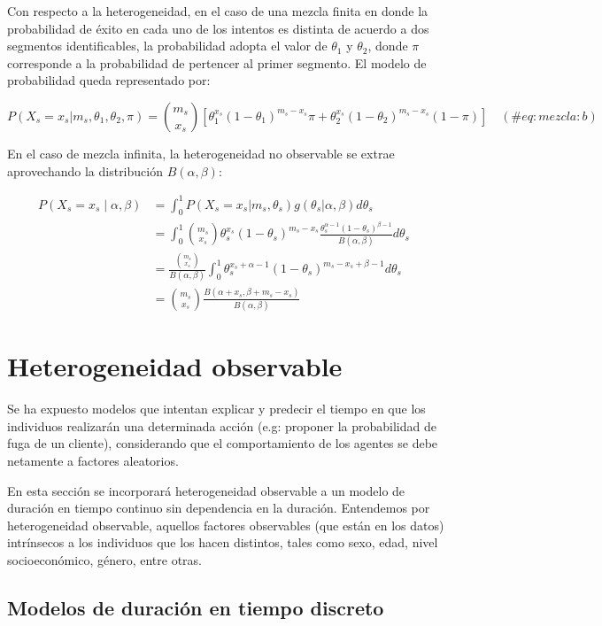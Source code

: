 \documentclass[
]{book}
\begin{document}
Con respecto a la heterogeneidad, en el caso de una mezcla finita en
donde la probabilidad de éxito en cada uno de los intentos es distinta
de acuerdo a dos segmentos identificables, la probabilidad adopta el
valor de \(\theta_1\) y \(\theta_2\), donde \(\pi\) corresponde a la
probabilidad de pertencer al primer segmento. El modelo de probabilidad
queda representado por:

\[P(X_s = x_s | m_s, \theta_1, \theta_2, \pi) = \binom{m_s}{x_s} \left[ \theta_1^{x_s}(1-\theta_1)^{m_s-x_s}\pi + \theta_2^{x_s}(1-\theta_2)^{m_s-x_s}(1-\pi) \right] \quad (\#eq:mezcla:b)\]

En el caso de mezcla infinita, la heterogeneidad no observable se extrae
aprovechando la distribución \(B(\alpha,\beta)\):

\[
\begin{aligned}
P(X_s = x_s \mid \alpha, \beta) &= \int_{0}^{1} P(X_s = x_s|m_s,\theta_s) g(\theta_s|\alpha,\beta)d\theta_s \\
&= \int_{0}^{1} \binom{m_s}{x_s} \theta_s^{x_s}(1-\theta_s)^{m_s-x_s} \frac{\theta_s^{\alpha-1}(1-\theta_s)^{\beta -1}}{B(\alpha,\beta)}d\theta_s \\
&= \frac{\binom{m_s}{x_s}}{B(\alpha,\beta)} \int_{0}^{1} \theta_s^{x_s+\alpha-1}(1-\theta_s)^{m_s-x_s+\beta-1} d\theta_s \\
&= \binom{m_s}{x_s} \frac{B(\alpha + x_s, \beta + m_s - x_s)}{B(\alpha,\beta)}
\end{aligned}
\quad \label{eq:beta-binomial}
\]

\section{Heterogeneidad observable}\label{heterogeneidad-observable}

Se ha expuesto modelos que intentan explicar y predecir el tiempo en que
los individuos realizarán una determinada acción (e.g: proponer la
probabilidad de fuga de un cliente), considerando que el comportamiento
de los agentes se debe netamente a factores aleatorios.

En esta sección se incorporará heterogeneidad observable a un modelo de
duración en tiempo continuo sin dependencia en la duración. Entendemos
por heterogeneidad observable, aquellos factores observables (que están
en los datos) intrínsecos a los individuos que los hacen distintos,
tales como sexo, edad, nivel socioeconómico, género, entre otras.

\subsection{Modelos de duración en tiempo discreto}\label{modelos-de-duraciuxf3n-en-tiempo-discreto}
\end{document}
